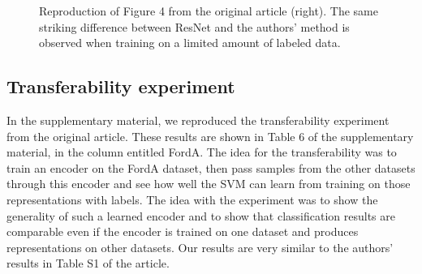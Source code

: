 \begin{figure}[h!]%
    \centering
    \qquad
    \caption{Reproduction of Figure 4 from the original article (right). The same striking difference between ResNet and the authors' method is observed when training on a limited amount of labeled data.}%
    \label{fig:sparse}%
\end{figure}

\subsection{Transferability experiment}
In the supplementary material, we reproduced the transferability experiment from the original article. These results are shown in Table 6 of the supplementary material, in the column entitled FordA. The idea for the transferability was to train an encoder on the FordA dataset, then pass samples from the other datasets through this encoder and see how well the SVM can learn from training on those representations with labels. The idea with the experiment was to show the generality of such a learned encoder and to show that classification results are comparable even if the encoder is trained on one dataset and produces representations on other datasets. Our results are very similar to the authors' results in Table S1 of the article.

